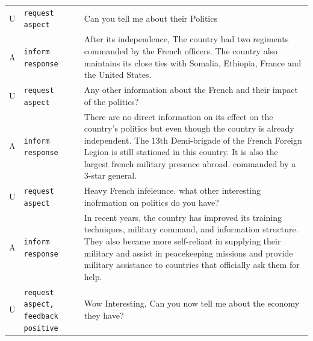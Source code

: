 \begin{table}[t]
\begin{center}
\begin{tabular}{p{0.2cm}p{3.8cm}p{11cm}}
            U & \texttt{request aspect}                      & Can you tell me about their Politics                                                                                                                                                                                                                                                                      \\
            A & \texttt{inform response}                     & After its independence, The country had two regiments commanded by the French officers. The country also maintains its close ties with Somalia, Ethiopia, France and the United States.                                                                                                                   \\
            U & \texttt{request aspect}                      & Any other information about the French and their impact of the politics?                                                                                                                                                                                                                                  \\
            A & \texttt{inform response}                     & There are no direct information on its effect on the country's politics but even though the country is already independent. The 13th Demi-brigade of the French Foreign Legion is still stationed in this country. It is also the largest french military presence abroad. commanded by a 3-star general. \\
            U & \texttt{request aspect}                      & Heavy French infeleunce. what other interesting inofrmation on politics do you have?                                                                                                                                                                                                                      \\
            A & \texttt{inform response}                     & In recent years, the country has improved its training techniques, military command, and information structure. They also became more self-reliant in supplying their military and assist in peacekeeping missions and provide military assistance to countries that officially ask them for help.        \\
            U & \texttt{request aspect, feedback positive}   & Wow Interesting, Can you now tell me about the economy they have?                                                                                                                                                                                                                                         \\

\end{tabular}
\end{center}
\end{table}
